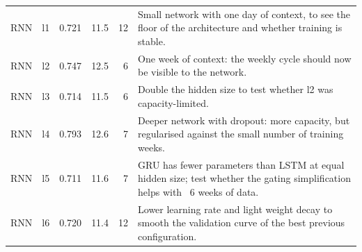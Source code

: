 \begin{tabular}{l l rr r p{10.4cm}}
RNN & l1 & 0.721 & 11.5 & 12 & Small network with one day of context, to see the floor of the architecture and whether training is stable. \\
RNN & l2 & 0.747 & 12.5 & 6 & One week of context: the weekly cycle should now be visible to the network. \\
RNN & l3 & 0.714 & 11.5 & 6 & Double the hidden size to test whether l2 was capacity-limited. \\
RNN & l4 & 0.793 & 12.6 & 7 & Deeper network with dropout: more capacity, but regularised against the small number of training weeks. \\
RNN & l5 & 0.711 & 11.6 & 7 & GRU has fewer parameters than LSTM at equal hidden size; test whether the gating simplification helps with ~6 weeks of data. \\
RNN & l6 & 0.720 & 11.4 & 12 & Lower learning rate and light weight decay to smooth the validation curve of the best previous configuration. \\
\bottomrule
\end{tabular}

